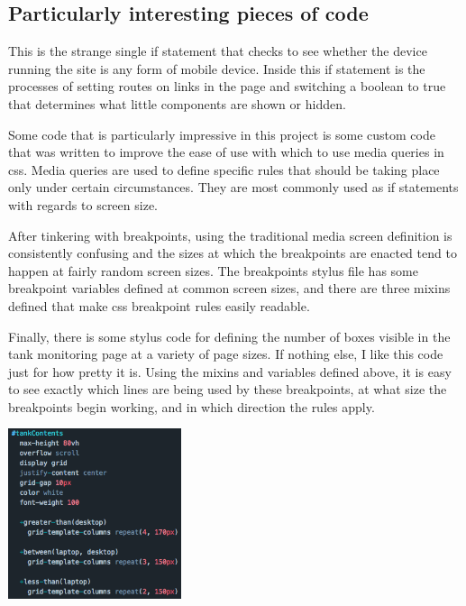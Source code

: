 \documentclass[draftclsnofoot,onecolumn,letterpaper,10pt,compsoc]{IEEEtran}
\begin{document}
\subsection{Particularly interesting pieces of code}

This is the strange single if statement that checks to see whether the device running the site is any form of mobile device.
Inside this if statement is the processes of setting routes on links in the page and switching a boolean to true that determines what little components are shown or hidden.

\lstset{language=JavaScript}


Some code that is particularly impressive in this project is some custom code that was written to improve the ease of use with which to use media queries in css.
Media queries are used to define specific rules that should be taking place only under certain circumstances.
They are most commonly used as if statements with regards to screen size.


After tinkering with breakpoints, using the traditional media screen definition is consistently confusing and the sizes at which the breakpoints are enacted tend to happen at fairly random screen sizes.
The breakpoints stylus file has some breakpoint variables defined at common screen sizes, and there are three mixins defined that make css breakpoint rules easily readable.

\lstset{language=Stylus}


Finally, there is some stylus code for defining the number of boxes visible in the tank monitoring page at a variety of page sizes.
If nothing else, I like this code just for how pretty it is.
Using the mixins and variables defined above, it is easy to see exactly which lines are being used by these breakpoints, at what size the breakpoints begin working, and in which direction the rules apply.

\centerline{\includegraphics[height=5cm]{screenshots/stylus.png}}
\end{document}
